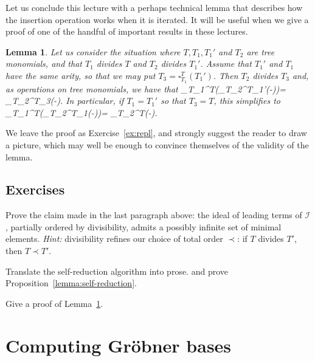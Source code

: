 \documentclass[fleqn, a4paper, twoside]{article}
\makeatletter
\newcommand{\repl}[3]{\square_{#1}^{#2}(#3)}
\newcommand{\0}{\langle 0\rangle}
\newcommand{\II}{\mathcal{I}}
\let\[\@undefined
\DeclareRobustCommand{\[}{\begin{equation}}%
\let\]\@undefined
\DeclareRobustCommand{\]}{\end{equation}}%
\theoremstyle{mytheorem}
\newtheorem{lemma}[theorem]{Lemma}
\theoremstyle{introthm}
\newcommand{\hacer}[1]{\todo[inline,linecolor=blue,backgroundcolor=blue!25!white,bordercolor=blue]{#1}}
\theoremstyle{mydefinition}
\theoremstyle{mydefinition2}
\theoremstyle{plain} %
\newcommand{\?}{\,?\,}
\theoremstyle{mytheorem}
\theoremstyle{plain} %
\newcommand\blankpage{%
    \null
    \thispagestyle{empty}%
    \newpage}
\makeatother
\begin{document}
Let us conclude this lecture with a perhaps technical
lemma that describes how the insertion operation
works when it is iterated. It will be useful when we
give a proof of one of the handful of important results 
in these lectures.

\begin{lemma}\label{lemma:repl}
Let us consider the situation where $T,T_1,T_1'$ and $T_2$ 
are tree monomials, and that $T_1$ divides $T$ and
$T_2$ divides $T_1'$. Assume that $T_1'$ and $T_1$ have
the same arity, so that we may put $T_3 = \repl{T_1}{T}{T_1'}$.
Then $T_2$ divides $T_3$ and, as operations on tree monomials,
we have that
\[ 
\repl{T_1}{T}{\repl{T_2}{T_1'}{-}}= 
 	\repl{T_2}{T_3}{-}.
\]
In particular, if $T_1=T_1'$ so that $T_3 = T$, this
simplifies to 
\[ 
\repl{T_1}{T}{\repl{T_2}{T_1}{-}}= 
 	\repl{T_2}{T}{-}.
\]
\end{lemma}

We leave the proof as Exercise~\ref{ex:repl}, and
strongly suggest the reader to draw a picture, which
may well be enough to convince themselves of the
validity of the lemma. 

\subsection{Exercises}

\begin{question}
Prove the claim made in the last paragraph above:
the ideal of leading terms of $\II$, partially ordered by
divisibility, admits a possibly infinite set of
minimal elements. \emph{Hint:} divisibility
refines our choice of total order $\prec$: if 
$T$ divides $T'$, then $T\prec T'$. 
\end{question}

\begin{question}\label{ex:self-reduction}
Translate the self-reduction algorithm into prose.
and prove Proposition~\ref{lemma:self-reduction}.
\end{question}

\begin{question}\label{ex:repl}
Give a proof of Lemma~\ref{lemma:repl}.
\end{question}
\vfill

\hacer{More exercises for Section 8} 

\newpage

\section{Computing Gr\"obner bases}
\end{document}
